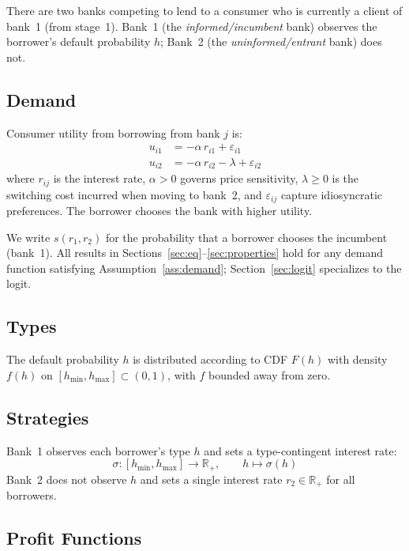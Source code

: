 \documentclass[12pt]{article}
\theoremstyle{plain}
\theoremstyle{plain}
\theoremstyle{definition}  %
\theoremstyle{remark}  %
\begin{document}
There are two banks competing to lend to a consumer who is currently a client of bank~1 (from stage~1). Bank~1 (the \emph{informed/incumbent} bank) observes the borrower's default probability $h$; Bank~2 (the \emph{uninformed/entrant} bank) does not.

\subsection{Demand}

Consumer utility from borrowing from bank $j$ is:
\begin{align*}
    u_{i1} &= -\alpha\, r_{i1} + \varepsilon_{i1} \\
    u_{i2} &= -\alpha\, r_{i2} - \lambda + \varepsilon_{i2}
\end{align*}
where $r_{ij}$ is the interest rate, $\alpha > 0$ governs price sensitivity, $\lambda \geq 0$ is the switching cost incurred when moving to bank~2, and $\varepsilon_{ij}$ capture idiosyncratic preferences. The borrower chooses the bank with higher utility.

We write $s(r_1, r_2)$ for the probability that a borrower chooses the incumbent (bank~1). All results in Sections~\ref{sec:eq}--\ref{sec:properties} hold for any demand function satisfying Assumption~\ref{ass:demand}; Section~\ref{sec:logit} specializes to the logit.

\subsection{Types}

The default probability $h$ is distributed according to CDF $F(h)$ with density $f(h)$ on $[h_{\min}, h_{\max}] \subset (0,1)$, with $f$ bounded away from zero.

\subsection{Strategies}

Bank~1 observes each borrower's type $h$ and sets a type-contingent interest rate:
$$\sigma: [h_{\min}, h_{\max}] \to \mathbb{R}_+, \qquad h \mapsto \sigma(h)$$
Bank~2 does not observe $h$ and sets a single interest rate $r_2 \in \mathbb{R}_+$ for all borrowers.

\subsection{Profit Functions}
\end{document}
